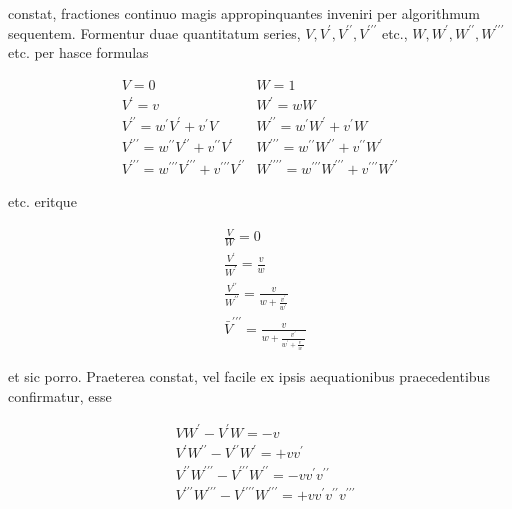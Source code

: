 \documentclass[10pt]{article}
\begin{document}
constat, fractiones continuo magis appropinquantes inveniri per algorithmum sequentem. Formentur duae quantitatum series, \(V, V^{\prime}, V^{\prime \prime}, V^{\prime \prime \prime}\) etc., \(W, W^{\prime}, W^{\prime \prime}, W^{\prime \prime \prime}\) etc. per hasce formulas

\[
\begin{array}{ll}
V=0 & W=1 \\
V^{\prime}=v & W^{\prime}=w W \\
V^{\prime \prime}=w^{\prime} V^{\prime}+v^{\prime} V & W^{\prime \prime}=w^{\prime} W^{\prime}+v^{\prime} W \\
V^{\prime \prime \prime}=w^{\prime \prime} V^{\prime \prime}+v^{\prime \prime} V^{\prime} & W^{\prime \prime \prime}=w^{\prime \prime} W^{\prime \prime}+v^{\prime \prime} W^{\prime} \\
V^{\prime \prime \prime}=w^{\prime \prime \prime} V^{\prime \prime \prime}+v^{\prime \prime \prime} V^{\prime \prime} & W^{\prime \prime \prime \prime}=w^{\prime \prime \prime} W^{\prime \prime \prime}+v^{\prime \prime \prime} W^{\prime \prime}
\end{array}
\]

etc. eritque

\[
\begin{aligned}
& \frac{V}{W}=0 \\
& \frac{V^{\prime}}{W^{\prime}}=\frac{v}{w} \\
& \frac{V^{\prime \prime}}{W^{\prime \prime}}=\frac{v}{w+\frac{v^{\prime}}{w^{\prime}}} \\
& \bar{V}^{\prime \prime \prime}=\frac{v}{w+\frac{v^{\prime}}{w^{\prime}+\frac{v^{\prime \prime}}{w^{\prime \prime}}}}
\end{aligned}
\]

et sic porro. Praeterea constat, vel facile ex ipsis aequationibus praecedentibus confirmatur, esse

\[
\begin{aligned}
& V W^{\prime}-V^{\prime} W=-v \\
& V^{\prime} W^{\prime \prime}-V^{\prime \prime} W^{\prime}=+v v^{\prime} \\
& V^{\prime \prime} W^{\prime \prime \prime}-V^{\prime \prime \prime} W^{\prime \prime}=-v v^{\prime} v^{\prime \prime} \\
& V^{\prime \prime \prime} W^{\prime \prime \prime}-V^{\prime \prime \prime \prime} W^{\prime \prime \prime}=+v v^{\prime} v^{\prime \prime} v^{\prime \prime \prime}
\end{aligned}
\]
\end{document}
